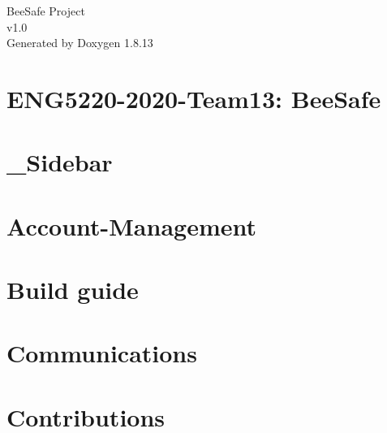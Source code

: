\documentclass[twoside]{book}
\newcommand{\+}{\discretionary{\mbox{\scriptsize$\hookleftarrow$}}{}{}}
\newcommand{\clearemptydoublepage}{%
  \newpage{\pagestyle{empty}\cleardoublepage}%
}
\begin{document}
\hypersetup{pageanchor=false,
             bookmarksnumbered=true,
             pdfencoding=unicode
            }
\begin{titlepage}
\vspace*{7cm}
\begin{center}%
{\Large Bee\+Safe Project \\[1ex]\large v1.\+0 }\\
\vspace*{1cm}
{\large Generated by Doxygen 1.8.13}\\
\end{center}
\end{titlepage}
\clearemptydoublepage
{}
\tableofcontents
\clearemptydoublepage
{}
\hypersetup{pageanchor=true}

\chapter{E\+N\+G5220-\/2020-\/\+Team13\+: Bee\+Safe}
\label{index}\hypertarget{index}{}
\chapter{\+\_\+\+Sidebar}
\label{md_doc_wiki___sidebar}

\chapter{Account-\/\+Management}
\label{md_doc_wiki__account-_management}

\chapter{Build guide}
\label{md_doc_wiki__build-_guide}

\chapter{Communications}
\label{md_doc_wiki__communications}

\chapter{Contributions}
\label{md_doc_wiki__contributions}

\end{document}
